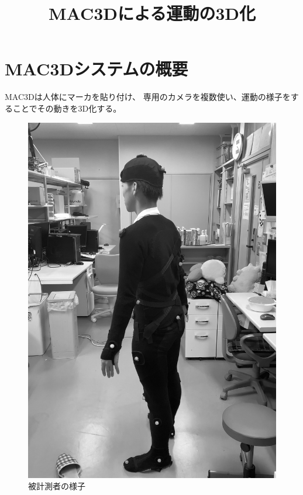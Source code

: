\documentclass{jsarticle}
\title{MAC3Dによる運動の3D化}
\date{}
\begin{document}
    \maketitle
    \section{MAC3Dシステムの概要}
        MAC3Dは人体にマーカを貼り付け、
        専用のカメラを複数使い、運動の様子をすることでその動きを3D化する。

        \begin{figure}[h]
            \begin{minipage}{0.5\hsize}
                \centering
                \includegraphics[width=0.9\hsize]{img/marker.jpg}
                \caption{被計測者の様子}
            \end{minipage}
            \begin{minipage}{0.5\hsize}
                \centering

\end{minipage}
\end{figure}
\end{document}
